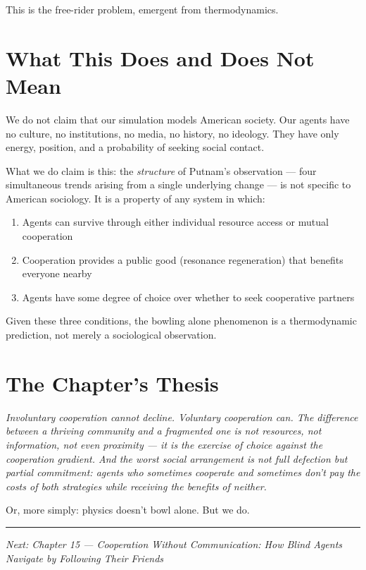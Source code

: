 This is the free-rider problem, emergent from thermodynamics.

\section{What This Does and Does Not Mean}\label{what-this-does-and-does-not-mean}

We do not claim that our simulation models American society. Our agents have no culture, no institutions, no media, no history, no ideology. They have only energy, position, and a probability of seeking social contact.

What we do claim is this: the \emph{structure} of Putnam's observation --- four simultaneous trends arising from a single underlying change --- is not specific to American sociology. It is a property of any system in which:

\begin{enumerate}
\def\labelenumi{\arabic{enumi}.}
\tightlist
\item
  Agents can survive through either individual resource access or mutual cooperation
\item
  Cooperation provides a public good (resonance regeneration) that benefits everyone nearby
\item
  Agents have some degree of choice over whether to seek cooperative partners
\end{enumerate}

Given these three conditions, the bowling alone phenomenon is a thermodynamic prediction, not merely a sociological observation.

\section{The Chapter's Thesis}\label{the-chapters-thesis}

\emph{Involuntary cooperation cannot decline. Voluntary cooperation can. The difference between a thriving community and a fragmented one is not resources, not information, not even proximity --- it is the exercise of choice against the cooperation gradient. And the worst social arrangement is not full defection but partial commitment: agents who sometimes cooperate and sometimes don't pay the costs of both strategies while receiving the benefits of neither.}

Or, more simply: physics doesn't bowl alone. But we do.

\begin{center}\rule{0.5\linewidth}{0.5pt}\end{center}

\emph{Next: Chapter 15 --- Cooperation Without Communication: How Blind Agents Navigate by Following Their Friends}

